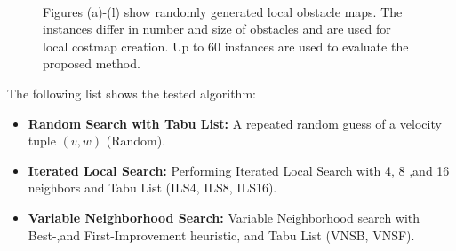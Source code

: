 \begin{figure}[thpb]
{       }\\
       \caption[Test instances]{Figures (a)-(l) show randomly generated local obstacle maps. The instances differ in number and size of obstacles and are used for local costmap creation. Up to 60 instances are used to evaluate the proposed method.}
      \label{fig:fig_instances}
   \end{figure}

The following list shows the tested algorithm:
\begin{itemize}
\item{\bf{Random Search with Tabu List:}} A repeated random guess of a velocity tuple $(v,w)$ (Random).
\item{\bf{Iterated Local Search:}} Performing Iterated Local Search with 4, 8 ,and 16 neighbors and Tabu List (ILS4, ILS8, ILS16).
\item{\bf{Variable Neighborhood Search:}} Variable Neighborhood search with Best-,and First-Improvement heuristic, and Tabu List (VNSB, VNSF).
\end{itemize}

